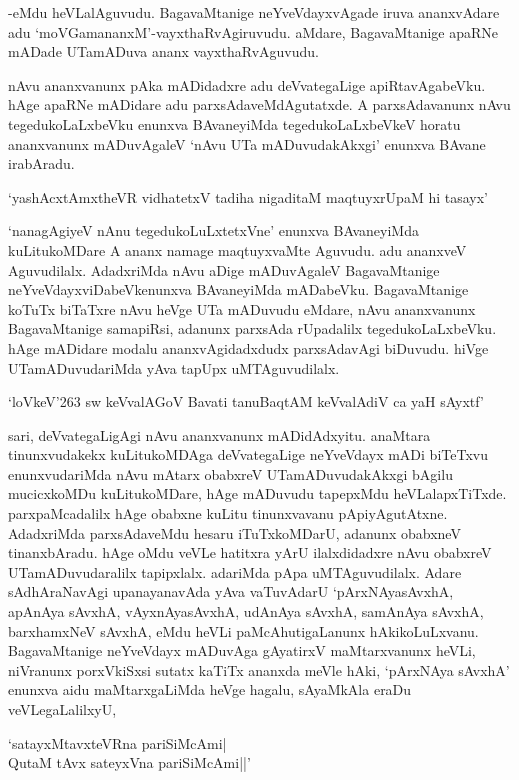 -eMdu heVLalAguvudu. BagavaMtanige neYveVdayxvAgade iruva ananxvAdare adu `moVGamananxM'-vayxthaRvAgiruvudu. aMdare, BagavaMtanige apaRNe mADade UTamADuva ananx vayxthaRvAguvudu.

nAvu ananxvanunx pAka mADidadxre adu deVvategaLige apiRtavAgabeVku. hAge apaRNe mADidare adu parxsAdaveMdAgutatxde. A parxsAdavanunx nAvu tegedukoLaLxbeVku enunxva BAvaneyiMda tegedukoLaLxbeVkeV horatu ananxvanunx mADuvAgaleV `nAvu UTa mADuvudakAkxgi' enunxva BAvane irabAradu.

\begin{shloka}
`yashAcxtAmxtheVR vidhatetxV tadiha nigaditaM maqtuyxrUpaM hi tasayx'
\end{shloka}

`nanagAgiyeV nAnu tegedukoLuLxtetxVne' enunxva BAvaneyiMda kuLitukoMDare A ananx namage maqtuyxvaMte Aguvudu. adu ananxveV Aguvudilalx. AdadxriMda nAvu aDige mADuvAgaleV BagavaMtanige neYveVdayxviDabeVkenunxva BAvaneyiMda mADabeVku. BagavaMtanige koTuTx biTaTxre nAvu heVge UTa mADuvudu eMdare, nAvu ananxvanunx BagavaMtanige samapiRsi, adanunx  parxsAda rUpadalilx tegedukoLaLxbeVku. hAge mADidare modalu ananxvAgidadxdudx  parxsAdavAgi biDuvudu. hiVge UTamADuvudariMda yAva tapUpx uMTAguvudilalx.

\begin{shloka}
`loVkeV\char'263 sw keVvalAGoV Bavati tanuBaqtAM keVvalAdiV ca yaH sAyxtf'
\end{shloka}

sari, deVvategaLigAgi nAvu ananxvanunx mADidAdxyitu. anaMtara tinunxvudakekx kuLitukoMDAga deVvategaLige neYveVdayx mADi biTeTxvu enunxvudariMda nAvu mAtarx obabxreV UTamADuvudakAkxgi bAgilu mucicxkoMDu kuLitukoMDare, hAge mADuvudu tapepxMdu heVLalapxTiTxde. parxpaMcadalilx hAge obabxne kuLitu tinunxvavanu pApiyAgutAtxne. AdadxriMda parxsAdaveMdu hesaru iTuTxkoMDarU, adanunx obabxneV tinanxbAradu. hAge oMdu veVLe hatitxra yArU ilalxdidadxre nAvu obabxreV UTamADuvudaralilx tapipxlalx. adariMda pApa uMTAguvudilalx. Adare sAdhAraNavAgi upanayanavAda yAva vaTuvAdarU `pArxNAyasAvxhA, apAnAya sAvxhA, vAyxnAyasAvxhA, udAnAya sAvxhA, samAnAya sAvxhA, barxhamxNeV sAvxhA, eMdu heVLi paMcAhutigaLanunx hAkikoLuLxvanu. BagavaMtanige neYveVdayx mADuvAga gAyatirxV maMtarxvanunx heVLi, niVranunx porxVkiSxsi sutatx kaTiTx ananxda meVle hAki, `pArxNAya sAvxhA' enunxva aidu maMtarxgaLiMda heVge hagalu, sAyaMkAla eraDu veVLegaLalilxyU,

\begin{shloka}
`satayxMtavxteVRna pariSiMcAmi|\\
QutaM tAvx sateyxVna pariSiMcAmi||'
\end{shloka}

